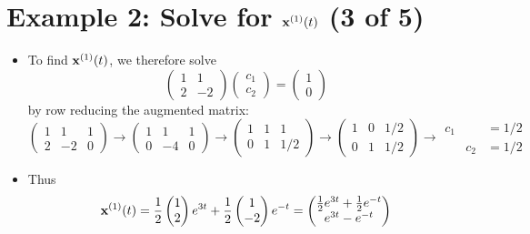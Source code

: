 \documentclass[11pt,a4paper]{article}
\begin{document}
	\section*{Example 2: Solve for $\vb{x}^{(1)}(t)$ (3 of 5)}
	\begin{itemize}
		\item To find $\vb{x}^{(1)}(t)$, we therefore solve
		$$
		\begin{pmatrix}
			1 & 1\\
			2 & -2
		\end{pmatrix}
		\begin{pmatrix}
			c_1\\
			c_2
		\end{pmatrix}=
		\begin{pmatrix}
			1\\
			0
		\end{pmatrix}
		$$
		by row reducing the augmented matrix:\\
		$
		\begin{pmatrix}
			1 & 1 & 1\\
			2 & -2 & 0
		\end{pmatrix}\to
		\begin{pmatrix}
			1 & 1 & 1\\
			0 & -4 & 0
		\end{pmatrix}\to
		\begin{pmatrix}
			1 & 1 & 1\\
			0 & 1 & 1/2
		\end{pmatrix}\to
		\begin{pmatrix}
			1 & 0 & 1/2\\
			0 & 1 & 1/2
		\end{pmatrix}\to
		\begin{matrix}
			c_1 & & =1/2\\
			& c_2 & =1/2
		\end{matrix}
		$
		\item Thus
		$$
		\vb{x}^{(1)}(t) = \frac{1}{2}
		\begin{pmatrix}
			1\\
			2
		\end{pmatrix}e^{3t} + \frac{1}{2}
		\begin{pmatrix}
			1\\
			-2
		\end{pmatrix}e^{-t}=
		\begin{pmatrix}
			\frac{1}{2}e^{3t} + \frac{1}{2}e^{-t}\\
			e^{3t} - e^{-t}
		\end{pmatrix}
		$$
	\end{itemize}
\end{document}
